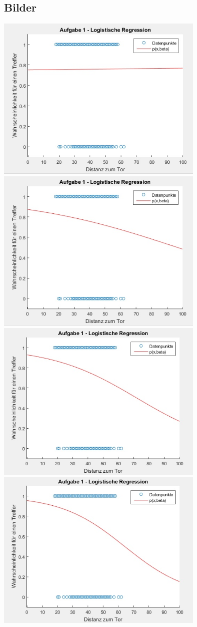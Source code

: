 \documentclass[12pt]{article}
\begin{document}
\newpage

\subsection{Bilder}

\begin{center}
\includegraphics[width=10cm]{plot1.jpg}
\includegraphics[width=10cm]{plot2.jpg}
\includegraphics[width=10cm]{plot3.jpg}
\includegraphics[width=10cm]{plot4.jpg}
\end{center}
\end{document}
